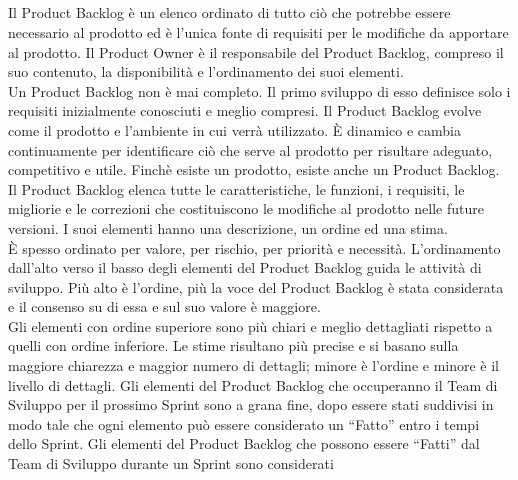 \subsection*{\color{SteelBlue}{Product Backlog}}
\label{sec:product_backlog}
Il Product Backlog \`e un elenco ordinato di tutto ciò che potrebbe essere necessario al prodotto ed \`e l'unica fonte di 
requisiti per le modifiche da apportare al prodotto. Il Product Owner \`e il responsabile del Product Backlog, compreso il suo 
contenuto, la disponibilità e l'ordinamento dei suoi elementi. \newline
\\Un Product Backlog non \`e mai completo. Il primo sviluppo di esso definisce solo i requisiti inizialmente conosciuti e 
meglio compresi. Il Product Backlog evolve come il prodotto e l'ambiente in cui verrà utilizzato. \`E dinamico e cambia 
continuamente per identificare ci\`o che serve al prodotto per risultare adeguato, competitivo e utile. Finch\`e esiste un 
prodotto, esiste anche un Product Backlog. \newline
\\Il Product Backlog elenca tutte le caratteristiche, le funzioni, i requisiti, le migliorie e le correzioni che costituiscono 
le modifiche al prodotto nelle future versioni. I suoi elementi hanno una descrizione, un ordine ed una stima. \newline
\\ \`E spesso ordinato per valore, per rischio, per priorità e necessità. L'ordinamento dall'alto verso il basso degli 
elementi del Product Backlog guida le attività di sviluppo. Pi\`u alto \`e l'ordine, pi\`u la voce del Product Backlog \`e 
stata considerata e il consenso su di essa e sul suo valore \`e maggiore. \newline
\\Gli elementi con ordine superiore sono pi\`u chiari e meglio dettagliati rispetto a quelli con ordine inferiore. Le stime 
risultano pi\`u precise e si basano sulla maggiore chiarezza e maggior numero di dettagli; minore è l'ordine e minore \`e il 
livello di dettagli. Gli elementi del Product Backlog che occuperanno il Team di Sviluppo per il prossimo Sprint sono a grana 
fine, dopo essere stati suddivisi in modo tale che ogni elemento pu\`o essere considerato un ``Fatto'' entro i tempi dello 
Sprint. Gli elementi del Product Backlog che possono essere ``Fatti'' dal Team di Sviluppo durante un Sprint sono considerati 
